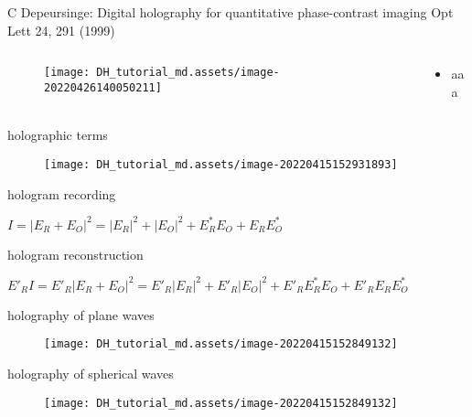 \documentclass[t, aspectratio=169]{beamer}
\begin{document}
\begin{frame}{C Depeursinge: Digital holography for quantitative phase-contrast imaging}
	\vspace{-3 mm}
	\small Opt Lett 24, 291 (1999)
	\begin{columns}
		\begin{column}{.6\textwidth}
			\begin{figure}
				\texttt{[image: DH\_tutorial\_md.assets/image-20220426140050211]}
			\end{figure}
		\end{column}
		\begin{column}{.4\textwidth}
			\begin{itemize}
				\item aaa
			\end{itemize}
		\end{column}
	\end{columns}
\end{frame}


\begin{frame}{holographic terms}
	\begin{figure}
		\texttt{[image: DH\_tutorial\_md.assets/image-20220415152931893]}
	\end{figure}	
hologram recording \\
	\begin{center}
		$I = |E_R + E_O|^2 = |E_R|^2 + |E_O|^2 +E_R^*E_O + E_RE_O^*$
	\end{center}
	\pause
hologram reconstruction \\
	\begin{center}
		$E'_RI = E'_R|E_R+E_O|^2 
		=E'_R|E_R|^2 + E'_R|E_O|^2 + E'_RE_R^*E_O + E'_RE_RE_O^*$
	\end{center}
\end{frame}


\begin{frame}{holography of plane waves}
	\begin{figure}
		\texttt{[image: DH\_tutorial\_md.assets/image-20220415152849132]}
	\end{figure}
\end{frame}


\begin{frame}{holography of spherical waves}
	\begin{figure}
		\texttt{[image: DH\_tutorial\_md.assets/image-20220415152849132]}
	\end{figure}
\end{frame}
\end{document}
